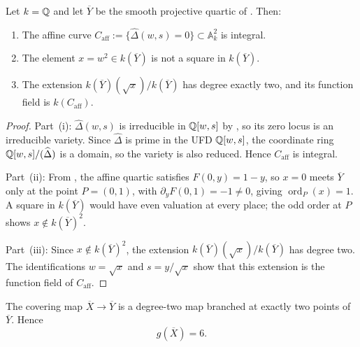 \begin{lemma}
  \label{lem:integral-function-field}
  Let \(k=\mathbb{Q}\) and let \(\overline{Y}\) be the smooth projective quartic
  of . Then:
  \begin{enumerate}[label=\textup{(\roman*)}]
    \item The affine curve \(C_{\mathrm{aff}}:=\{\widehat\Delta(w,s)=0\}
          \subset\mathbb{A}^2_k\) is integral.
    \item The element \(x=w^2\in k(\overline{Y})\) is not a square
          in \(k(\overline{Y})\).
    \item The extension \(k(\overline{Y})(\sqrt{x})/k(\overline{Y})\)
          has degree exactly two, and its function field is \(k(C_{\mathrm{aff}})\).
  \end{enumerate}
\end{lemma}

\begin{proof}

Part~(i): \(\widehat\Delta(w,s)\) is irreducible in \(\mathbb{Q}[w,s]\) by
, so its zero locus is an irreducible
variety. Since \(\widehat\Delta\) is prime in the UFD \(\mathbb{Q}[w,s]\), the
coordinate ring \(\mathbb{Q}[w,s]/(\widehat\Delta)\) is a domain, so the
variety is also reduced. Hence \(C_{\mathrm{aff}}\) is integral.

Part~(ii): From , the affine quartic
satisfies \(F(0,y)=1-y\), so \(x=0\) meets \(\overline{Y}\) only at
the point \(P=(0,1)\), with \(\partial_y F(0,1)=-1\neq 0\), giving
\(\operatorname{ord}_P(x)=1\). A square in \(k(\overline{Y})\) would
have even valuation at every place; the odd order at \(P\) shows
\(x\notin k(\overline{Y})^2\).

Part~(iii): Since \(x\notin k(\overline{Y})^2\), the extension
\(k(\overline{Y})(\sqrt{x})/k(\overline{Y})\) has degree two. The
identifications \(w=\sqrt{x}\) and \(s=y/\sqrt{x}\) show that this
extension is the function field of \(C_{\mathrm{aff}}\).

\end{proof}

\begin{proposition}
  \label{prop:sync-hatdelta-double-cover}
  The covering map \(\overline{X}\to\overline{Y}\) is a degree-two map
  branched at exactly two points of \(\overline{Y}\). Hence
  \[
    g(\overline{X})=6.
  \]
\end{proposition}

